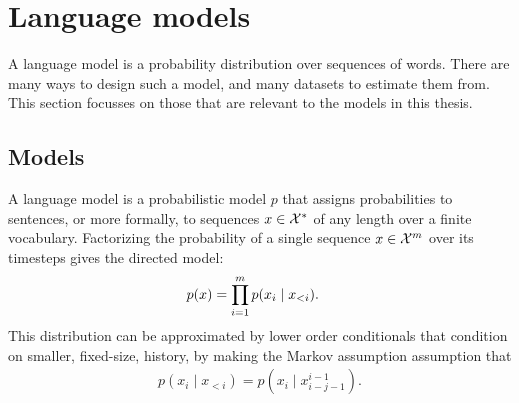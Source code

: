 \section{Language models}
  A language model is a probability distribution over sequences of words. There are many ways to design such a model, and many datasets to estimate them from. This section focusses on those that are relevant to the models in this thesis.

  \subsection{Models}
    A language model is a probabilistic model $p$ that assigns probabilities to sentences, or more formally, to sequences $x \in \mathcal{X}^{*}$ of any length over a finite vocabulary. Factorizing the probability of a single sequence $x \in \mathcal{X}^m$ over its timesteps gives the directed model:
    \begin{align}
      \label{eq:lm-factorized}
      p( x )
        &= \prod_{i=1}^m p(x_i \mid x_{<i}).
    \end{align}
    This distribution can be approximated by lower order conditionals that condition on smaller, fixed-size, history, by making the Markov assumption assumption that
    \begin{align*}
      p(x_i \mid x_{<i}) = p(x_i \mid x_{i-j-1}^{i-1}).
    \end{align*}
